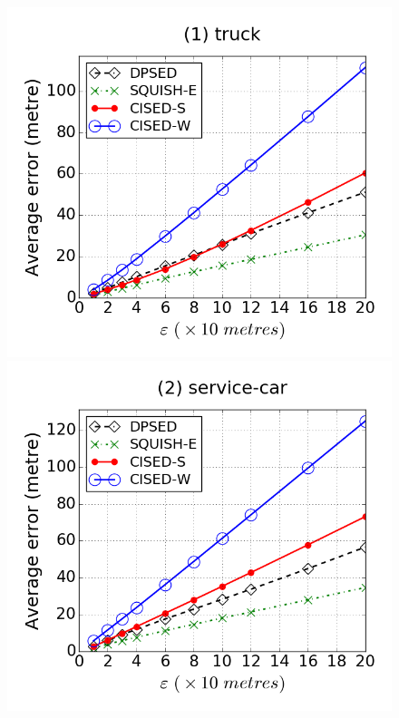 \begin{figure}[tb]
\centering
\includegraphics[scale = 0.240]{figures/Exp-error-epsilon-truck.png}
\includegraphics[scale = 0.240]{figures/Exp-error-epsilon-service.png}

\end{figure}
